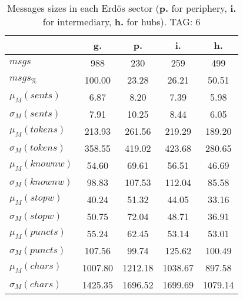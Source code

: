 \begin{table}[h!]
\begin{center}
\begin{tabular}{| l | c | c | c | c |}\hline
 & g. & p. & i. & h. \\\hline
$msgs$ & 988  & 230  & 259  & 499 \\\hline
$msgs_{\%}$ & 100.00  & 23.28  & 26.21  & 50.51 \\\hline
$\mu_M(sents)$ & 6.87  & 8.20  & 7.39  & 5.98 \\\hline
$\sigma_M(sents)$ & 7.91  & 10.25  & 8.44  & 6.05 \\\hline
$\mu_M(tokens)$ & 213.93  & 261.56  & 219.29  & 189.20 \\\hline
$\sigma_M(tokens)$ & 358.55  & 419.02  & 423.68  & 280.65 \\\hline
$\mu_M(knownw)$ & 54.60  & 69.61  & 56.51  & 46.69 \\\hline
$\sigma_M(knownw)$ & 98.83  & 107.53  & 112.04  & 85.58 \\\hline
$\mu_M(stopw)$ & 40.24  & 51.32  & 44.05  & 33.16 \\\hline
$\sigma_M(stopw)$ & 50.75  & 72.04  & 48.71  & 36.91 \\\hline
$\mu_M(puncts)$ & 55.24  & 62.45  & 53.14  & 53.01 \\\hline
$\sigma_M(puncts)$ & 107.56  & 99.74  & 125.62  & 100.49 \\\hline
$\mu_M(chars)$ & 1007.80  & 1212.18  & 1038.67  & 897.58 \\\hline
$\sigma_M(chars)$ & 1425.35  & 1696.52  & 1699.69  & 1079.14 \\\hline
\end{tabular}
\caption{Messages sizes in each Erd\"os sector ({{\bf p.}} for periphery, {{\bf i.}} for intermediary, {{\bf h.}} for hubs). TAG: 6}
\end{center}
\end{table}